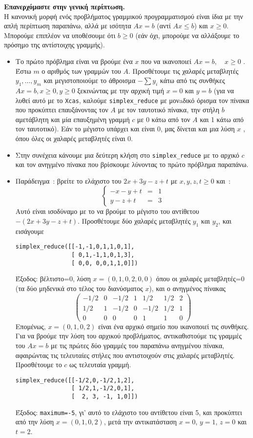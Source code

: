 \documentclass[a4paper,11pt]{book}
\newcommand{\en}{\selectlanguage{english}}
\begin{document}
{\bf Επανερχόμαστε στην γενική περίπτωση.}\\
Η κανονική μορφή ενός προβλήματος  γραμμικού προγραμματισμού είναι ίδια με
την απλή περίπτωση παραπάνω, αλλά με ισότητα $Ax=b$ (αντί $Ax\leq b$)
και  $x\geq 0$. Μπορούμε επιπλέον  να υποθέσουμε ότι $b\geq 0$
(εάν όχι,  μπορούμε να αλλάξουμε το πρόσημο της αντίστοιχης γραμμής).
\begin{itemize}
\item Το πρώτο πρόβλημα είναι να βρούμε ένα $x$ που να ικανοποιεί $Ax=b, \quad x\geq 0$ .
Έστω $m$ ο αριθμός των γραμμών του $A$. Προσθέτουμε τις χαλαρές μεταβλητές  
$y_1,...,y_m$ και μεγιστοποιούμε το άθροισμα
$-\sum y_i$ κάτω από τις συνθήκες $Ax=b, x \geq 0, y \geq 0$ 
ξεκινώντας με την αρχική τιμή  $x=0$
και $y=b$
(για να λυθεί αυτό με το {\en\tt Xcas}, καλούμε {\en \tt \verb|simplex_reduce|} με
 μονaδικό όρισμα τον πίνακα που προκύπτει επαυξάνοντας τον $A$ με τον
ταυτοτικό πίνακα, την στήλη $b$ αμετάβλητη και μία επαυξημένη γραμμή  
$c$ με  0 κάτω από τον $A$ και 1 κάτω από τον ταυτοτικό).
Εάν το μέγιστο υπάρχει και είναι 0, μας δίνεται και μια λύση $x$ , όπου όλες οι χαλαρές 
μεταβλητές  είναι 0.
\item Στην συνέχεια κάνουμε μια δεύτερη κλήση στο {\en\tt \verb|simplex_reduce|}
με το αρχικό $c$ και τον ανηγμένο πίνακα που βρίσκουμε λύνοντας το πρώτο πρόβλημα παραπάνω.
\item
Παράδειγμα~: βρείτε το ελάχιστο του $2x+3y-z+t$ με 
$x,y,z,t\geq 0$ και~:
\[ \left\{ \begin{array}{rcl}
-x-y+t&=&1\\
y-z+t&=&3
\end{array}
\right. \]
Αυτό είναι ισοδύναμο με το να βρούμε το μέγιστο του αντίθετου $-(2x+3y-z+t)$.
Προσθέτουμε δύο χαλαρές μεταβλητές $y_1$ και $y_2$, και εισάγουμε
{\en \begin{verbatim}
simplex_reduce([[-1,-1,0,1,1,0,1], 
                [ 0,1,-1,1,0,1,3], 
                [ 0,0, 0,0,1,1,0]])
\end{verbatim}}
Έξοδος: βέλτιστο=0, λύση $x=(0,1,0,2,0,0)$ όπου οι χαλαρές μεταβλητές=0 (τα δύο μηδενικά στο τέλος του διανύσματος $x$), και ο ανηγμένος πίνακας
\[
\left(\begin{array}{ccccccc}
-1/2 & 0 & -1/2 & 1 & 1/2 & 1/2 & 2 \\
1/2 & 1 & -1/2 & 0 & -1/2 & 1/2 & 1 \\
0 & 0 & 0 & 0 & 1 & 1 & 0
\end{array}\right) 
\]
Επομένως, $x=(0,1,0,2)$ είναι ένα αρχικό σημείο που ικανοποιεί τις συνθήκες.
Για να βρούμε την λύση του αρχικού προβλήματος,  αντικαθιστούμε τις 
γραμμές του $Ax=b$ με τις πρώτες δύο γραμμές του παραπάνω ανηγμένου πίνακα,
αφαιρώντας τις τελευταίες στήλες που αντιστοιχούν στις χαλαρές μεταβλητές.
Προσθέτουμε το $c$ ως τελευταία γραμμή.
{\en \begin{verbatim}
simplex_reduce([[-1/2,0,-1/2,1,2],
                [ 1/2,1,-1/2,0,1],
                [  2, 3, -1, 1,0]])
\end{verbatim}}
Έξοδος: {\en\tt maximum=-5}, γι' αυτό το ελάχιστο του αντίθετου είναι 5,
και προκύπτει από την λύση $x=(0,1,0,2)$, μετά την αντικατάσταση 
$x=0$, $y=1$, $z=0$ και $t=2$.
\end{itemize}
\end{document}
